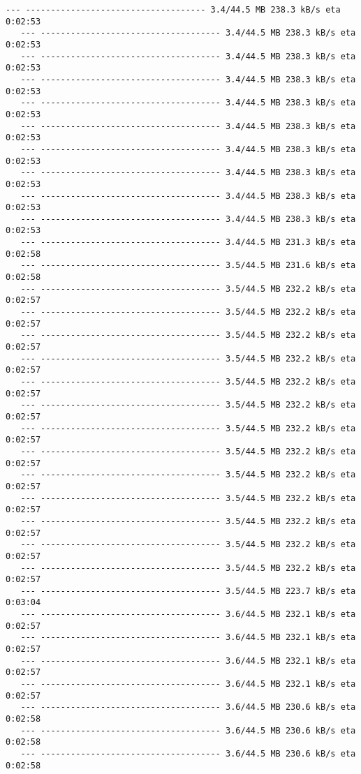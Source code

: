 \documentclass[11pt]{article}
\begin{document}
\begin{Verbatim}[commandchars=\\\{\}]
   --- ------------------------------------ 3.4/44.5 MB 238.3 kB/s eta 0:02:53
   --- ------------------------------------ 3.4/44.5 MB 238.3 kB/s eta 0:02:53
   --- ------------------------------------ 3.4/44.5 MB 238.3 kB/s eta 0:02:53
   --- ------------------------------------ 3.4/44.5 MB 238.3 kB/s eta 0:02:53
   --- ------------------------------------ 3.4/44.5 MB 238.3 kB/s eta 0:02:53
   --- ------------------------------------ 3.4/44.5 MB 238.3 kB/s eta 0:02:53
   --- ------------------------------------ 3.4/44.5 MB 238.3 kB/s eta 0:02:53
   --- ------------------------------------ 3.4/44.5 MB 238.3 kB/s eta 0:02:53
   --- ------------------------------------ 3.4/44.5 MB 238.3 kB/s eta 0:02:53
   --- ------------------------------------ 3.4/44.5 MB 238.3 kB/s eta 0:02:53
   --- ------------------------------------ 3.4/44.5 MB 231.3 kB/s eta 0:02:58
   --- ------------------------------------ 3.5/44.5 MB 231.6 kB/s eta 0:02:58
   --- ------------------------------------ 3.5/44.5 MB 232.2 kB/s eta 0:02:57
   --- ------------------------------------ 3.5/44.5 MB 232.2 kB/s eta 0:02:57
   --- ------------------------------------ 3.5/44.5 MB 232.2 kB/s eta 0:02:57
   --- ------------------------------------ 3.5/44.5 MB 232.2 kB/s eta 0:02:57
   --- ------------------------------------ 3.5/44.5 MB 232.2 kB/s eta 0:02:57
   --- ------------------------------------ 3.5/44.5 MB 232.2 kB/s eta 0:02:57
   --- ------------------------------------ 3.5/44.5 MB 232.2 kB/s eta 0:02:57
   --- ------------------------------------ 3.5/44.5 MB 232.2 kB/s eta 0:02:57
   --- ------------------------------------ 3.5/44.5 MB 232.2 kB/s eta 0:02:57
   --- ------------------------------------ 3.5/44.5 MB 232.2 kB/s eta 0:02:57
   --- ------------------------------------ 3.5/44.5 MB 232.2 kB/s eta 0:02:57
   --- ------------------------------------ 3.5/44.5 MB 232.2 kB/s eta 0:02:57
   --- ------------------------------------ 3.5/44.5 MB 232.2 kB/s eta 0:02:57
   --- ------------------------------------ 3.5/44.5 MB 223.7 kB/s eta 0:03:04
   --- ------------------------------------ 3.6/44.5 MB 232.1 kB/s eta 0:02:57
   --- ------------------------------------ 3.6/44.5 MB 232.1 kB/s eta 0:02:57
   --- ------------------------------------ 3.6/44.5 MB 232.1 kB/s eta 0:02:57
   --- ------------------------------------ 3.6/44.5 MB 232.1 kB/s eta 0:02:57
   --- ------------------------------------ 3.6/44.5 MB 230.6 kB/s eta 0:02:58
   --- ------------------------------------ 3.6/44.5 MB 230.6 kB/s eta 0:02:58
   --- ------------------------------------ 3.6/44.5 MB 230.6 kB/s eta 0:02:58

\end{Verbatim}
\end{document}
